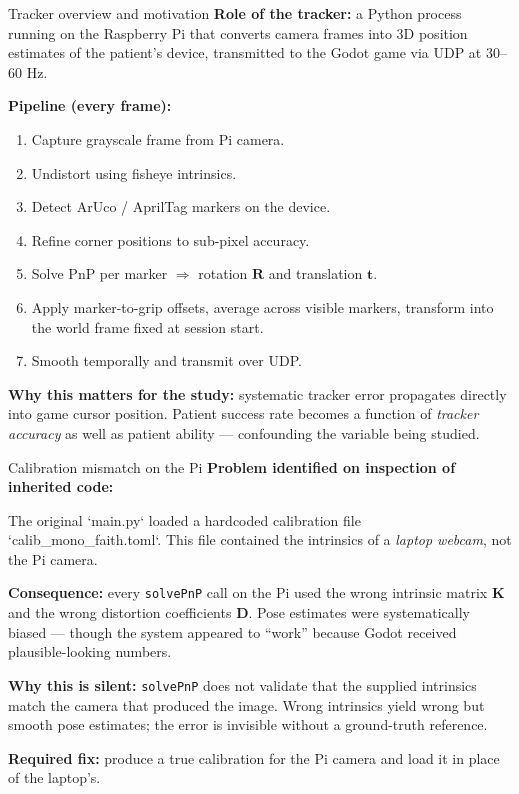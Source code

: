 \documentclass[10pt,aspectratio=169]{beamer}
\begin{document}
\begin{frame}{Tracker overview and motivation}
\textbf{Role of the tracker:} a Python process running on the Raspberry Pi that converts camera frames into 3D position estimates of the patient's device, transmitted to the Godot game via UDP at 30--60 Hz.

\textbf{Pipeline (every frame):}
\begin{enumerate}
    \item Capture grayscale frame from Pi camera.
    \item Undistort using fisheye intrinsics.
    \item Detect ArUco / AprilTag markers on the device.
    \item Refine corner positions to sub-pixel accuracy.
    \item Solve PnP per marker $\Rightarrow$ rotation $\mathbf{R}$ and translation $\mathbf{t}$.
    \item Apply marker-to-grip offsets, average across visible markers, transform into the world frame fixed at session start.
    \item Smooth temporally and transmit over UDP.
\end{enumerate}

\textbf{Why this matters for the study:} systematic tracker error propagates directly into game cursor position. Patient success rate becomes a function of \emph{tracker accuracy} as well as patient ability --- confounding the variable being studied.
\end{frame}

\begin{frame}{Calibration mismatch on the Pi}
\textbf{Problem identified on inspection of inherited code:}

The original `main.py` loaded a hardcoded calibration file `calib_mono_faith.toml`. This file contained the intrinsics of a \emph{laptop webcam}, not the Pi camera.

\textbf{Consequence:} every \texttt{solvePnP} call on the Pi used the wrong intrinsic matrix $\mathbf{K}$ and the wrong distortion coefficients $\mathbf{D}$. Pose estimates were systematically biased --- though the system appeared to ``work'' because Godot received plausible-looking numbers.

\textbf{Why this is silent:} \texttt{solvePnP} does not validate that the supplied intrinsics match the camera that produced the image. Wrong intrinsics yield wrong but smooth pose estimates; the error is invisible without a ground-truth reference.

\textbf{Required fix:} produce a true calibration for the Pi camera and load it in place of the laptop's.
\end{frame}
\end{document}
